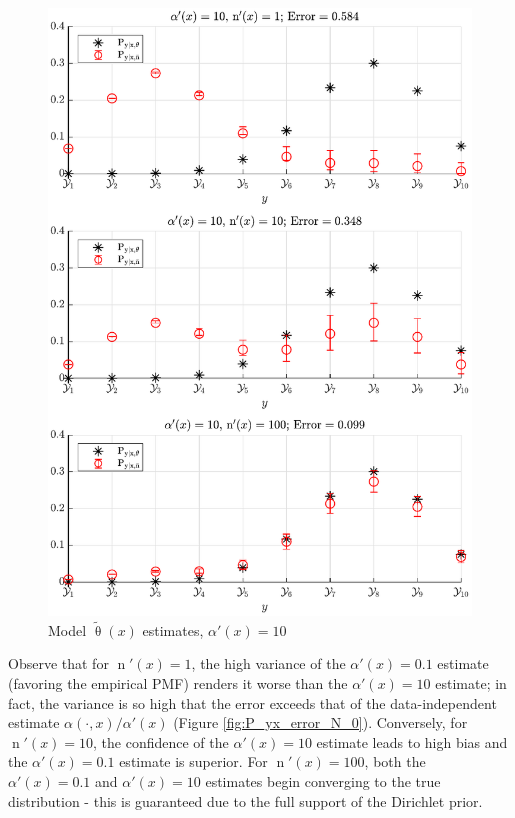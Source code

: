 \documentclass[conference]{IEEEtran}
\DeclareMathOperator{\nrm}{\mathrm{n}}
\begin{document}
\begin{figure}
\centering
\includegraphics[width=1\linewidth]{P_yx_error_a0_10.pdf}
\caption{Model $\tilde{\uptheta}(x)$ estimates, $\alpha'(x) = 10$}
\label{fig:P_yx_error_a0_10}
\end{figure}

Observe that for $\nrm'(x) = 1$, the high variance of the $\alpha'(x) = 0.1$ estimate (favoring the empirical PMF) renders it worse than the $\alpha'(x) = 10$ estimate; in fact, the variance is so high that the error exceeds that of the data-independent estimate $\alpha(\cdot,x) / \alpha'(x)$ (Figure \ref{fig:P_yx_error_N_0}). Conversely, for $\nrm'(x) = 10$, the confidence of the $\alpha'(x) = 10$ estimate leads to high bias and the $\alpha'(x) = 0.1$ estimate is superior. For $\nrm'(x) = 100$, both the $\alpha'(x) = 0.1$ and $\alpha'(x) = 10$ estimates begin converging to the true distribution - this is guaranteed due to the full support of the Dirichlet prior.
\end{document}
